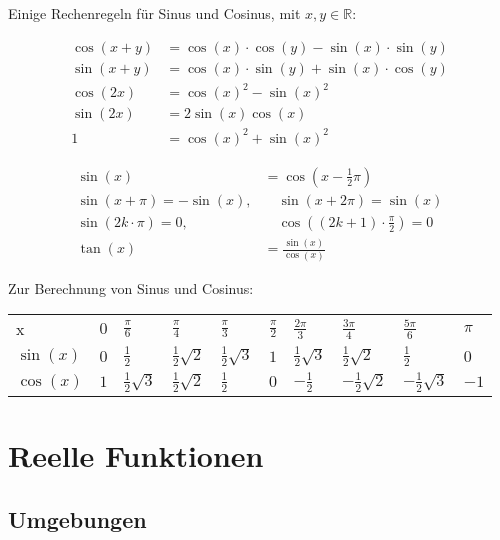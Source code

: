 \documentclass{panikzettel}
\newcommand{\R}{\mathbb{R}}
\begin{document}
Einige Rechenregeln für Sinus und Cosinus, mit $x,y \in \R$: \\
\begin{halfboxl}
  \vspace{-\baselineskip}
  \begin{align*}
    \cos(x+y) &= \cos(x) \cdot \cos(y) - \sin(x) \cdot \sin(y) \\
    \sin(x+y) &= \cos(x) \cdot \sin(y) + \sin(x) \cdot \cos(y) \\
    \cos(2x) &= \cos(x)^2 - \sin(x)^2 \\
    \sin(2x) &= 2 \sin(x) \cos(x) \\
    1 &= \cos(x)^2 + \sin(x)^2
  \end{align*}
\end{halfboxl}%
\begin{halfboxr}
  \vspace{-\baselineskip}
  \begin{align*}
    \sin(x) &= \cos(x - \frac{1}{2} \pi) \\
    \sin(x + \pi) = -\sin(x), & \quad \sin(x + 2 \pi) = \sin(x) \\
    \sin(2k \cdot \pi) = 0, & \quad \cos((2k+1) \cdot \frac{\pi}{2}) = 0 \\
    \tan(x) &= \frac{\sin(x)}{\cos(x)}
  \end{align*}
\end{halfboxr}

Zur Berechnung von Sinus und Cosinus:

{\setlength{\extrarowheight}{10pt}
\begin{tabularx}{\textwidth}{Y|Y|Y|Y|Y|Y|Y|Y|Y|Y}
  x & $0$ & $\frac{\pi}{6}$ & $\frac{\pi}{4}$ & $\frac{\pi}{3}$ & $\frac{\pi}{2}$ & $\frac{2\pi}{3}$ & $\frac{3\pi}{4}$ & $\frac{5\pi}{6}$ & $\pi$ \\
  $\sin(x)$ & $0$ & $\frac{1}{2}$ & $\frac{1}{2} \sqrt{2}$ & $\frac{1}{2} \sqrt{3}$ & $1$ & $\frac{1}{2} \sqrt{3}$ & $\frac{1}{2} \sqrt{2}$ & $\frac{1}{2}$ & $0$ \\
  $\cos(x)$ & $1$ & $\frac{1}{2} \sqrt{3}$ & $\frac{1}{2} \sqrt{2}$ & $\frac{1}{2}$ & $0$ & $-\frac{1}{2}$ & $-\frac{1}{2} \sqrt{2}$ & $-\frac{1}{2} \sqrt{3}$ & $-1$
\end{tabularx}}
\medskip

\section{Reelle Funktionen}

\subsection{Umgebungen}
\end{document}
